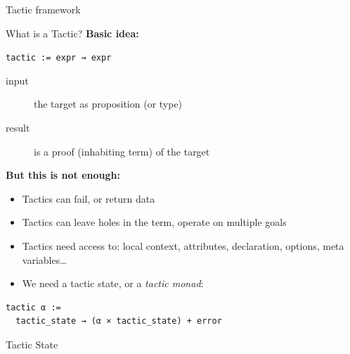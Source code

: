 \documentclass[usenames,dvipsnames]{beamer}
\newcommand{\sect}[1]{\begin{frame}
  \begin{center} \Huge{\usebeamercolor[fg]{structure} #1} \end{center}
  \end{frame}
  }
\begin{document}
\sect{Tactic framework}

\begin{frame}[fragile]{What is a Tactic?}
  \textbf{Basic idea:}
  \begin{center} \lstinline$tactic := expr → expr$ \end{center}
  \begin{description}
    \item[input] the target as proposition (or type)
    \item[result] is a proof (inhabiting term) of the target
  \end{description}

  \textbf{But this is not enough:}
  \begin{itemize}
    \item Tactics can fail, or return data
    \item Tactics can leave holes in the term, operate on multiple goals
    \item Tactics need access to: local context, attributes, declaration, options,
      meta variables\ldots
    \item We need a tactic state, or a \emph{tactic monad}:
  \end{itemize}
\begin{lstlisting}
tactic α :=
  tactic_state → (α × tactic_state) + error
\end{lstlisting}

\end{frame}

\begin{frame}[fragile]{Tactic State}
\end{frame}
\end{document}
